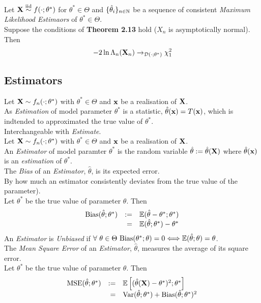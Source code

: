 \documentclass[11pt,a4paper]{article}
\begin{document}
Let $\textbf{X}\overset{\text{iid}}{\sim} f(\cdot;\theta^*)$ for $\theta^*\in\Theta$ and $\{\hat\theta_i\}_{n\in\mathbb{N}}$ be a sequence of consistent \textit{Maximum Likelihood Estimaors} of $\theta^*\in\Theta$.\\
Suppose the conditions of \textbf{Theorem 2.13} hold (\ie $X_n$ is asymptotically normal). Then
$$-2\ln\Lambda_n(\textbf{X}_n)\to_{\mathcal{D}(\cdot;\theta^*)}\chi^2_1$$

\subsection{Estimators}

Let $\textbf{X}\sim f_n(\cdot;\theta^*)$ with $\theta^*\in\Theta$ and $\textbf{x}$ be a realisation of $\textbf{X}$.\\
As \textit{Estimation} of model parameter $\theta^*$ is a statistic, $\hat\theta(\textbf{x})=T(\textbf{x})$, which is indtended to approximated the true value of $\theta^*$.\\
\nb Interchangeable with \textit{Estimate}.\\

Let $\textbf{X}\sim f_n(\cdot;\theta^*)$ with $\theta^*\in\Theta$ and $\textbf{x}$ be a realisation of $\textbf{X}$.\\
An \textit{Estimator} of model paramter $\theta^*$ is the random variable $\hat\theta:=\hat\theta(\textbf{X})$ where $\hat\theta(\textbf{x})$ is an \textit{estimation} of $\theta^*$.\\

The \textit{Bias} of an \textit{Estimator}, $\hat\theta$, is its expected error.\\
\ie By how much an estimator consistently deviates from the true value of the parameter).\\
Let $\theta^*$ be the true value of parameter $\theta$. Then
\[\begin{array}{rrl}
\text{Bias}(\hat\theta;\theta^*)&:=&\mathbb{E}(\hat\theta-\theta^*;\theta^*)\\
&=&\mathbb{E}(\hat\theta;\theta^*)-\theta^*
\end{array}\]
\nb An \textit{Estimator} is \textit{Unbiased} if $\forall\ \theta\in\Theta\ \text{Bias}(\theta^*;\theta)=0\Longleftrightarrow\expect(\hat\theta;\theta)=\theta$.\\

The \textit{Mean Square Error} of an \textit{Estimator}, $\hat\theta$, measures the average of its square error.\\
Let $\theta^*$ be the true value of parameter $\theta$. Then
\[\begin{array}{rrl}
\text{MSE}(\hat\theta;\theta^*)&:=&\mathbb{E}\left[(\hat\theta(\textbf{X})-\theta^*)^2;\theta^*\right]\\
&=&\mathrm{Var}(\hat\theta;\theta^*)+\text{Bias}(\hat\theta;\theta^*)^2
\end{array}\]
\end{document}
